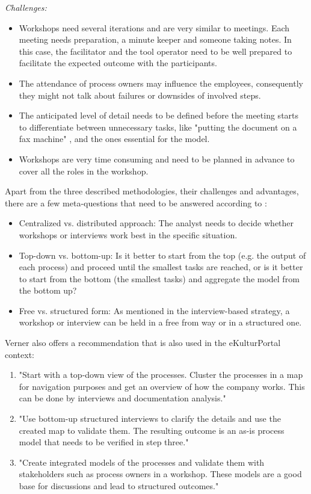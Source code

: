 \textit{Challenges:}
\begin{itemize}
\item Workshops need several iterations and are very similar to meetings. Each meeting needs preparation, a minute keeper and someone taking notes. In this case, the facilitator and the tool operator need to be well prepared to facilitate the expected outcome with the participants.
\item The attendance of process owners may influence the employees, consequently they might not talk about failures or downsides of involved steps. 
\item The anticipated level of detail needs to be defined before the meeting starts to differentiate between unnecessary tasks, like "putting the document on a fax machine" \cite{Dumas2013}, and the ones essential for the model. 
\item Workshops are very time consuming and need to be planned in advance to cover all the roles in the workshop.
\end{itemize}

Apart from the three described methodologies, their challenges and advantages, there are a few meta-questions that need to be answered according to \cite{Verner2004}:
\begin{itemize}
\item Centralized vs. distributed approach: The analyst needs to decide whether workshops or interviews work best in the specific situation.
\item Top-down vs. bottom-up: Is it better to start from the top (e.g. the output of each process) and proceed until the smallest tasks are reached, or is it better to start from the bottom (the smallest tasks) and aggregate the model from the bottom up? 
\item Free vs. structured form: As mentioned in the interview-based strategy, a workshop or interview can be held in a free from way or in a structured one. 
\end{itemize}

Verner \cite{Verner2004} also offers a recommendation that is also used in the eKulturPortal context: 
\begin{enumerate}
\item "Start with a top-down view of the processes. Cluster the processes in a map for navigation purposes and get an overview of how the company works. This can be done by interviews and documentation analysis."
\item "Use bottom-up structured interviews to clarify the details and use the created map to validate them. The resulting outcome is an as-is process model that needs to be verified in step three."
\item "Create integrated models of the processes and validate them with stakeholders such as process owners in a workshop. These models are a good base for discussions and lead to structured outcomes." 
\end{enumerate}

